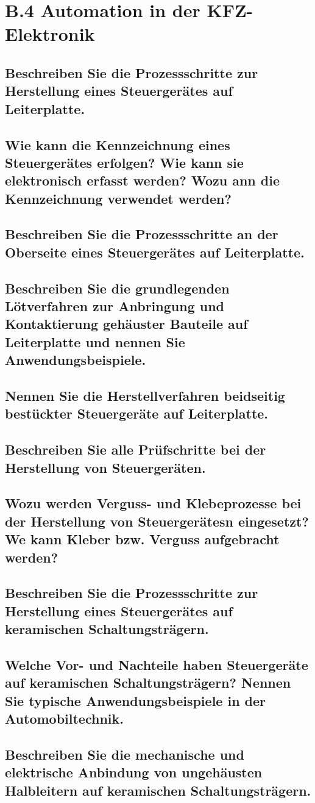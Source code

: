\section*{B.4 Automation in der KFZ-Elektronik}

\subsection{Beschreiben Sie die Prozessschritte zur Herstellung eines Steuergerätes auf Leiterplatte.}

\subsection{Wie kann die Kennzeichnung eines Steuergerätes erfolgen? Wie kann sie elektronisch erfasst werden? Wozu ann die Kennzeichnung verwendet werden?}

\subsection{Beschreiben Sie die Prozessschritte an der Oberseite eines Steuergerätes auf Leiterplatte.}

\subsection{Beschreiben Sie die grundlegenden Lötverfahren zur Anbringung und Kontaktierung gehäuster Bauteile auf Leiterplatte und nennen Sie Anwendungsbeispiele.}

\subsection{Nennen Sie die Herstellverfahren beidseitig bestückter Steuergeräte auf Leiterplatte.}

\subsection{Beschreiben Sie alle Prüfschritte bei der Herstellung von Steuergeräten.}

\subsection{Wozu werden Verguss- und Klebeprozesse bei der Herstellung von Steuergerätesn eingesetzt? We kann Kleber bzw. Verguss aufgebracht werden?}

\subsection{Beschreiben Sie die Prozessschritte zur Herstellung eines Steuergerätes auf keramischen Schaltungsträgern.}

\subsection{Welche Vor- und Nachteile haben Steuergeräte auf keramischen Schaltungsträgern? Nennen Sie typische Anwendungsbeispiele in der Automobiltechnik.}

\subsection{Beschreiben Sie die mechanische und elektrische Anbindung von ungehäusten Halbleitern auf keramischen Schaltungsträgern.}
